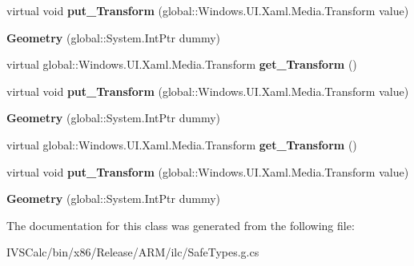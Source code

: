 \begin{DoxyCompactItemize}
\item 
\mbox{\label{class_windows_1_1_u_i_1_1_xaml_1_1_media_1_1_geometry_a9af8f19a41909c886897170efd35d45d}} 
virtual void {\bfseries put\+\_\+\+Transform} (global\+::\+Windows.\+U\+I.\+Xaml.\+Media.\+Transform value)
\item 
\mbox{\label{class_windows_1_1_u_i_1_1_xaml_1_1_media_1_1_geometry_a9463ad2bd82641d8a3f900c9bacdaefd}} 
{\bfseries Geometry} (global\+::\+System.\+Int\+Ptr dummy)
\item 
\mbox{\label{class_windows_1_1_u_i_1_1_xaml_1_1_media_1_1_geometry_a26afd36bad6c79f34f6f4011e49799f3}} 
virtual global\+::\+Windows.\+U\+I.\+Xaml.\+Media.\+Transform {\bfseries get\+\_\+\+Transform} ()
\item 
\mbox{\label{class_windows_1_1_u_i_1_1_xaml_1_1_media_1_1_geometry_a9af8f19a41909c886897170efd35d45d}} 
virtual void {\bfseries put\+\_\+\+Transform} (global\+::\+Windows.\+U\+I.\+Xaml.\+Media.\+Transform value)
\item 
\mbox{\label{class_windows_1_1_u_i_1_1_xaml_1_1_media_1_1_geometry_a9463ad2bd82641d8a3f900c9bacdaefd}} 
{\bfseries Geometry} (global\+::\+System.\+Int\+Ptr dummy)
\item 
\mbox{\label{class_windows_1_1_u_i_1_1_xaml_1_1_media_1_1_geometry_a26afd36bad6c79f34f6f4011e49799f3}} 
virtual global\+::\+Windows.\+U\+I.\+Xaml.\+Media.\+Transform {\bfseries get\+\_\+\+Transform} ()
\item 
\mbox{\label{class_windows_1_1_u_i_1_1_xaml_1_1_media_1_1_geometry_a9af8f19a41909c886897170efd35d45d}} 
virtual void {\bfseries put\+\_\+\+Transform} (global\+::\+Windows.\+U\+I.\+Xaml.\+Media.\+Transform value)
\item 
\mbox{\label{class_windows_1_1_u_i_1_1_xaml_1_1_media_1_1_geometry_a9463ad2bd82641d8a3f900c9bacdaefd}} 
{\bfseries Geometry} (global\+::\+System.\+Int\+Ptr dummy)
\end{DoxyCompactItemize}


The documentation for this class was generated from the following file\+:\begin{DoxyCompactItemize}
\item 
I\+V\+S\+Calc/bin/x86/\+Release/\+A\+R\+M/ilc/Safe\+Types.\+g.\+cs\end{DoxyCompactItemize}

